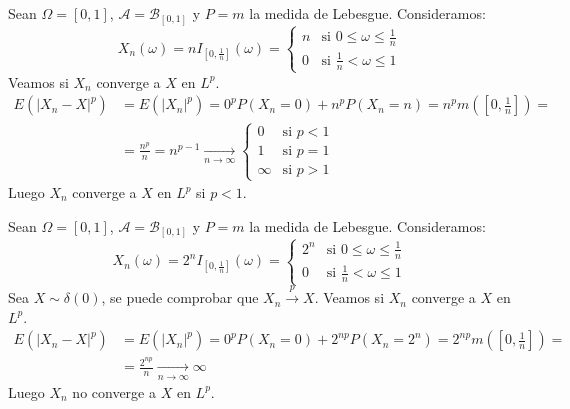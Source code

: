 \begin{example}
    Sean $\Omega = [0, 1]$, $\mathcal{A} = \mathcal{B}_{[0, 1]}$ y $P = m$ la medida de Lebesgue.
    Consideramos:
    $$X_n(\omega) = n I_{[0, \frac{1}{n}]}(\omega) = \begin{cases}
            n & \text{si } 0 \leq \omega \leq \frac{1}{n} \\
            0 & \text{si } \frac{1}{n} < \omega \leq 1
        \end{cases}$$
    Veamos si $X_n$ converge a $X$ en $L^p$.
    \begin{align*}
        E(|X_n - X|^p) & = E(|X_n|^p) = 0^pP(X_n = 0) + n^pP(X_n = n) = n^pm\left(\left[0, \frac{1}{n}\right]\right) = \\
                       & = \frac{n^p}{n} = n^{p-1} \xrightarrow[n \to \infty]{} \begin{cases}
                                                                                    0      & \text{si } p < 1 \\
                                                                                    1      & \text{si } p = 1 \\
                                                                                    \infty & \text{si } p > 1
                                                                                \end{cases}
    \end{align*}
    Luego $X_n$ converge a $X$ en $L^p$ si $p < 1$.
\end{example}

\begin{example}
    Sean $\Omega = [0, 1]$, $\mathcal{A} = \mathcal{B}_{[0, 1]}$ y $P = m$ la medida de Lebesgue.
    Consideramos:
    $$X_n(\omega) = 2^n I_{[0, \frac{1}{n}]}(\omega) = \begin{cases}
            2^n & \text{si } 0 \leq \omega \leq \frac{1}{n} \\
            0   & \text{si } \frac{1}{n} < \omega \leq 1
        \end{cases}$$
    Sea $X \sim \delta(0)$, se puede comprobar que $X_n \xrightarrow{p} X$.
    Veamos si $X_n$ converge a $X$ en $L^p$.
    \begin{align*}
        E(|X_n - X|^p) & = E(|X_n|^p) = 0^pP(X_n = 0) + 2^{np}P(X_n = 2^n) = 2^{np}m\left(\left[0, \frac{1}{n}\right]\right) = \\
                       & = \frac{2^{np}}{n} \xrightarrow[n \to \infty]{} \infty
    \end{align*}
    Luego $X_n$ no converge a $X$ en $L^p$.
\end{example}


